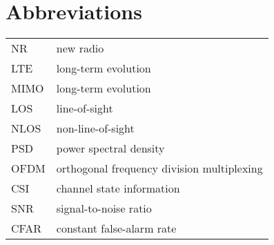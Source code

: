 \chapter*{Abbreviations} %

\begin{table}[H]
    \begin{tabular}{ll}
        NR & new radio\\[2px]
        LTE & long-term evolution \\[2px]
        MIMO & long-term evolution \\[2px]
        LOS & line-of-sight \\[2px]
        NLOS & non-line-of-sight \\[2px]
        PSD & power spectral density  \\[2px]
        OFDM & orthogonal frequency division multiplexing \\[2px]
        CSI & channel state information \\[2px]
        SNR & signal-to-noise ratio \\[2px]
        CFAR & constant false-alarm rate \\[2px]
        
    \end{tabular}
\end{table}